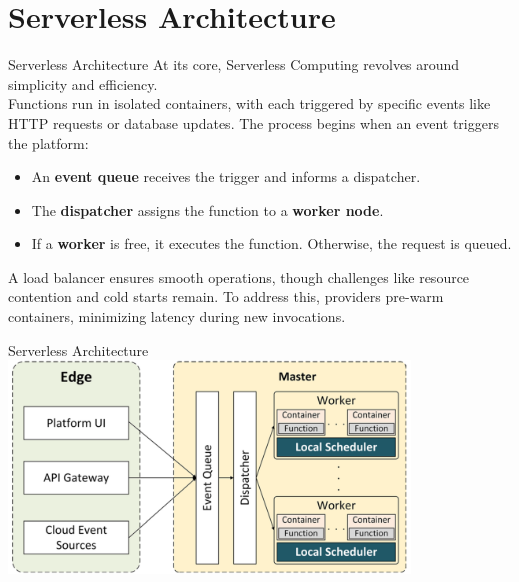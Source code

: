 \documentclass[aspectratio=169]{beamer}
\begin{document}
\section{Serverless Architecture}
\begin{frame}{Serverless Architecture}
At its core, Serverless Computing revolves around simplicity and efficiency.\\
Functions run in isolated containers, with each triggered by specific events like HTTP requests or database updates.
The process begins when an event triggers the platform:
\begin{itemize}
    \item An \textbf{event queue} receives the trigger and informs a dispatcher.
    \item The \textbf{dispatcher} assigns the function to a \textbf{worker node}.
    \item If a \textbf{worker} is free, it executes the function. Otherwise, the request is queued.
\end{itemize}
A load balancer ensures smooth operations, though challenges like resource contention and cold starts remain. To address this, providers pre-warm containers, minimizing latency during new invocations.    
\end{frame}

\begin{frame}{Serverless Architecture}
\centering
\includegraphics[width=0.8\textwidth]{img/arch.png}
\end{frame}

\end{document}
